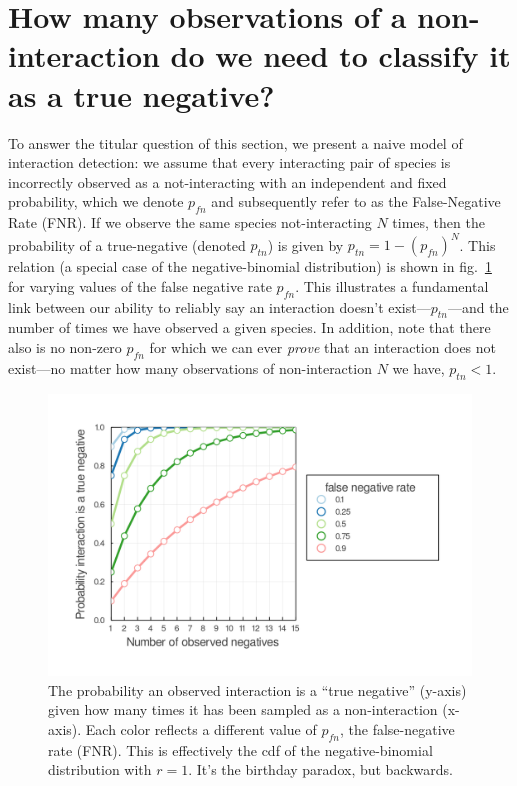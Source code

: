 \documentclass[11pt]{article}
\makeatletter
\def\maxwidth{\ifdim\Gin@nat@width>\linewidth\linewidth
\else\Gin@nat@width\fi}
\let\Oldincludegraphics\includegraphics
\renewcommand{\includegraphics}[1]{\Oldincludegraphics[width=\maxwidth]{#1}}
\makeatother
\begin{document}
\hypertarget{how-many-observations-of-a-non-interaction-do-we-need-to-classify-it-as-a-true-negative}{%
\section{How many observations of a non-interaction do we need to
classify it as a true
negative?}\label{how-many-observations-of-a-non-interaction-do-we-need-to-classify-it-as-a-true-negative}}

To answer the titular question of this section, we present a naive model
of interaction detection: we assume that every interacting pair of
species is incorrectly observed as a not-interacting with an independent
and fixed probability, which we denote \(p_{fn}\) and subsequently refer
to as the False-Negative Rate (FNR). If we observe the same species
not-interacting \(N\) times, then the probability of a true-negative
(denoted \(p_{tn}\)) is given by \(p_{tn} = 1 - (p_{fn})^N\). This
relation (a special case of the negative-binomial distribution) is shown
in fig.~\ref{fig:negativebinom} for varying values of the false negative
rate \(p_{fn}\). This illustrates a fundamental link between our ability
to reliably say an interaction doesn't exist---\(p_{tn}\)---and the
number of times we have observed a given species. In addition, note that
there also is no non-zero \(p_{fn}\) for which we can ever \emph{prove}
that an interaction does not exist---no matter how many observations of
non-interaction \(N\) we have, \(p_{tn} < 1\).

\begin{figure}
\hypertarget{fig:negativebinom}{%
\centering
\includegraphics{./figures/negativebinomial.png}
\caption{The probability an observed interaction is a ``true negative''
(y-axis) given how many times it has been sampled as a non-interaction
(x-axis). Each color reflects a different value of \(p_{fn}\), the
false-negative rate (FNR). This is effectively the cdf of the
negative-binomial distribution with \(r=1\). It's the birthday paradox,
but backwards.}\label{fig:negativebinom}
}
\end{figure}
\end{document}
